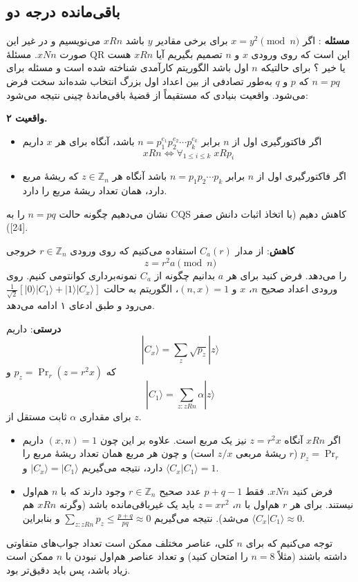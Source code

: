 \subsection{باقی‌مانده درجه دو}
\textbf{مسئله} : 
اگر $x = y^2 \pmod{n}$ برای برخی مقادیر $y$ باشد $x R n$ می‌نویسیم و در غیر این صورت $x N n$. مسئلهٔ QR این است که روی ورودی
$x$
 و
$n$ 
تصمیم بگیریم آیا $x R n$ هست یا خیر ؟ برای حالتیکه $n$ اول باشد الگوریتم کارآمدی شناخته شده است و مسئله برای $n = pq$ که
$p$
و
$q$ 
به‌طور تصادفی از بین اعداد اول بزرگ انتخاب شده‌اند سخت فرض می‌شود. واقعیت بنیادی که مستقیماً از قضیهٔ باقی‌ماندهٔ چینی نتیجه می‌شود:

\textbf{واقعیت ۲.}
\begin{itemize}
	\item 
	اگر فاکتورگیری اول از $n$ برابر $n = p_1^{e_1} p_2^{e_2} \cdots p_k^{e_k}$ باشد، آنگاه برای هر $x$ داریم 
	$$x R n \Leftrightarrow \forall_{1 \le i \le k} \; x R p_i$$
	\item
	اگر فاکتورگیری اول از $n$ برابر $n = p_1 p_2 \cdots p_k$ باشد آنگاه هر $z \in \mathbb{Z}_n$ که ریشهٔ مربع دارد، همان تعداد ریشهٔ مربع را دارد.
\end{itemize}
نشان می‌دهیم چگونه حالت $n = pq$ را به CQS کاهش دهیم (با اتخاذ اثبات دانش صفر [24]).

\textbf{کاهش}:
 از مدار $C_a(r)$ استفاده می‌کنیم که روی ورودی 
$r \in \mathbb{Z}_n$
  خروجی
$$z = r^2 a \pmod{n}$$
 را می‌دهد. فرض کنید برای هر $a$ بدانیم چگونه از $C_a$ نمونه‌برداری کوانتومی کنیم. روی ورودی اعداد صحیح 
 $n$،
  $x$ 
  و
 $(n,x) = 1$،
  الگوریتم به حالت $\frac{1}{\sqrt{2}}[|0\rangle |C_1\rangle + |1\rangle |C_x\rangle]$ می‌رود و طبق ادعای ۱ ادامه می‌دهد.

\textbf{درستی}:
 داریم
  \begin{equation}\label{eq7}
  	|C_x\rangle = \sum_z \sqrt{p_z} |z\rangle
  \end{equation} 
 که $p_z = \Pr_r(z = r^2 x)$ و
  \begin{equation}\label{eq8}
  	|C_1\rangle = \sum_{z: z R n} \alpha |z\rangle
  \end{equation}
 برای مقداری $\alpha$ ثابت مستقل از $z$. 
 \begin{itemize}
 	\item 
 	 اگر $x R n$ آنگاه $z = r^2 x$ نیز یک مربع است. علاوه بر این چون $(x,n) = 1$ داریم
 	  $p_z = \Pr_r$
 	  ($r$ 
 	 ریشهٔ مربعی 
 	 $ z/x $
 	 است)
 	 و چون هر مربع همان تعداد ریشهٔ مربع را دارد، نتیجه می‌گیریم $|C_x\rangle = |C_1\rangle$ و $\langle C_x | C_1 \rangle = 1$. 
 	\item
 	 فرض کنید $x N n$. فقط $p + q - 1$ عدد صحیح $r \in \mathbb{Z}_n$ وجود دارند که با $n$ هم‌اول نیستند. برای هر $r$ هم‌اول با $n$، $z = x r^2$ باید یک غیرباقی‌مانده باشد (وگرنه $x R n$ هم می‌شد). نتیجه می‌گیریم $\sum_{z: z R n} p_z \le \frac{p+q}{pq} \approx 0$ و بنابراین $\langle C_x | C_1 \rangle \approx 0$. 
 \end{itemize}
توجه می‌کنیم که برای $n$ کلی، عناصر مختلف ممکن است تعداد جواب‌های متفاوتی داشته باشند (مثلاً $n = 8$ را امتحان کنید) و تعداد عناصر هم‌اول نبودن با $n$ ممکن است زیاد باشد، پس باید دقیق‌تر بود.
